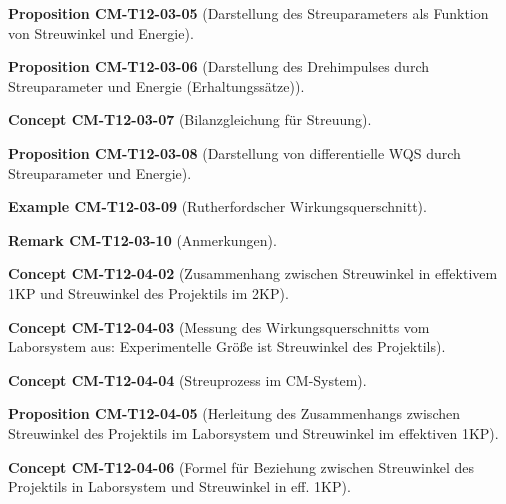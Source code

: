 \documentclass[10pt, letterpaper]{article}
\newcommand{\CustomHeading}[3]{%
  \par\medskip\noindent%
  \textbf{#1 #2} \textnormal{(#3)}.\enskip%
}
\newenvironment{PROP}[2]{\CustomHeading{Proposition}{#1}{#2}}{}
\newenvironment{REM}[2]{\CustomHeading{Remark}{#1}{#2}}{}
\newenvironment{EXA}[2]{\CustomHeading{Example}{#1}{#2}}{}
\newenvironment{CONC}[2]{\CustomHeading{Concept}{#1}{#2}}{}
\begin{document}
\begin{PROP}{CM-T12-03-05}{Darstellung des Streuparameters als Funktion von Streuwinkel und Energie}
\end{PROP}

\begin{PROP}{CM-T12-03-06}{Darstellung des Drehimpulses durch Streuparameter und Energie (Erhaltungssätze)}
\end{PROP}

\begin{CONC}{CM-T12-03-07}{Bilanzgleichung für Streuung}
\end{CONC}

\begin{PROP}{CM-T12-03-08}{Darstellung von differentielle WQS durch Streuparameter und Energie}
\end{PROP}

\begin{EXA}{CM-T12-03-09}{Rutherfordscher Wirkungsquerschnitt}
\end{EXA}

\begin{REM}{CM-T12-03-10}{Anmerkungen}
\end{REM}

\begin{CONC}{CM-T12-04-02}{Zusammenhang zwischen Streuwinkel in effektivem 1KP und Streuwinkel des Projektils im 2KP}
\end{CONC}

\begin{CONC}{CM-T12-04-03}{Messung des Wirkungsquerschnitts vom Laborsystem aus: Experimentelle Größe ist Streuwinkel des Projektils}
\end{CONC}

\begin{CONC}{CM-T12-04-04}{Streuprozess im CM-System}
\end{CONC}

\begin{PROP}{CM-T12-04-05}{Herleitung des Zusammenhangs zwischen Streuwinkel des Projektils im Laborsystem und Streuwinkel im effektiven 1KP}
\end{PROP}

\begin{CONC}{CM-T12-04-06}{Formel für Beziehung zwischen Streuwinkel des Projektils in Laborsystem und Streuwinkel in eff. 1KP}
\end{CONC}
\end{document}
